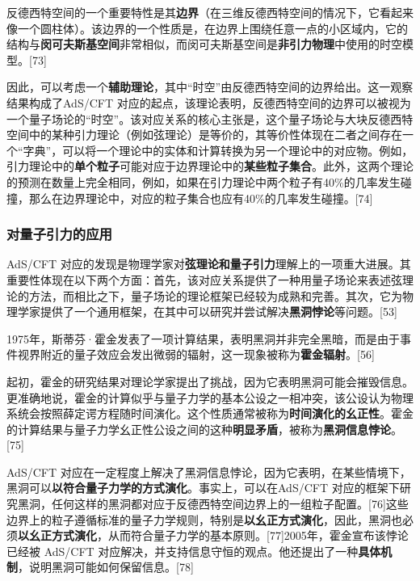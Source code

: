 反德西特空间的一个重要特性是其\textbf{边界}（在三维反德西特空间的情况下，它看起来像一个圆柱体）。该边界的一个性质是，在边界上围绕任意一点的小区域内，它的结构与\textbf{闵可夫斯基空间}非常相似，而闵可夫斯基空间是\textbf{非引力物理}中使用的时空模型。[73]  

因此，可以考虑一个\textbf{辅助理论}，其中“时空”由反德西特空间的边界给出。这一观察结果构成了AdS/CFT 对应的起点，该理论表明，反德西特空间的边界可以被视为一个量子场论的“时空”。该对应关系的核心主张是，这个量子场论与大块反德西特空间中的某种引力理论（例如弦理论）是等价的，其等价性体现在二者之间存在一个“字典”，可以将一个理论中的实体和计算转换为另一个理论中的对应物。例如，引力理论中的\textbf{单个粒子}可能对应于边界理论中的\textbf{某些粒子集合}。此外，这两个理论的预测在数量上完全相同，例如，如果在引力理论中两个粒子有40\%的几率发生碰撞，那么在边界理论中，对应的粒子集合也应有40\%的几率发生碰撞。[74]
\subsubsection{对量子引力的应用}
AdS/CFT 对应的发现是物理学家对\textbf{弦理论和量子引力}理解上的一项重大进展。其重要性体现在以下两个方面：首先，该对应关系提供了一种用量子场论来表述弦理论的方法，而相比之下，量子场论的理论框架已经较为成熟和完善。其次，它为物理学家提供了一个通用框架，在其中可以研究并尝试解决\textbf{黑洞悖论}等问题。[53]

1975年，斯蒂芬·霍金发表了一项计算结果，表明黑洞并非完全黑暗，而是由于事件视界附近的量子效应会发出微弱的辐射，这一现象被称为\textbf{霍金辐射}。[56]  

起初，霍金的研究结果对理论学家提出了挑战，因为它表明黑洞可能会摧毁信息。更准确地说，霍金的计算似乎与量子力学的基本公设之一相冲突，该公设认为物理系统会按照薛定谔方程随时间演化。这个性质通常被称为\textbf{时间演化的幺正性}。霍金的计算结果与量子力学幺正性公设之间的这种\textbf{明显矛盾}，被称为\textbf{黑洞信息悖论}。[75]

AdS/CFT 对应在一定程度上解决了黑洞信息悖论，因为它表明，在某些情境下，黑洞可以\textbf{以符合量子力学的方式演化}。事实上，可以在AdS/CFT 对应的框架下研究黑洞，任何这样的黑洞都对应于反德西特空间边界上的一组粒子配置。[76]这些边界上的粒子遵循标准的量子力学规则，特别是\textbf{以幺正方式演化}，因此，黑洞也必须\textbf{以幺正方式演化}，从而符合量子力学的基本原则。[77]2005年，霍金宣布该悖论已经被 AdS/CFT 对应解决，并支持信息守恒的观点。他还提出了一种\textbf{具体机制}，说明黑洞可能如何保留信息。[78]
